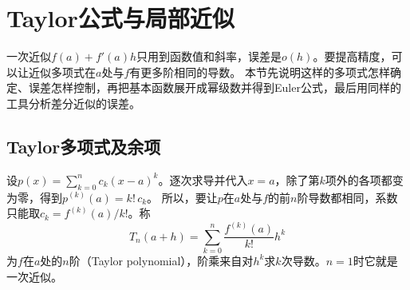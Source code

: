 \section{Taylor公式与局部近似}
\label{sec:ru-taylor}
\label{sec:analysis-taylor-approximation}

一次近似$f(a)+f'(a)h$只用到函数值和斜率，误差是$o(h)$。要提高精度，可以让近似多项式在$a$处与$f$有更多阶相同的导数。
本节先说明这样的多项式怎样确定、误差怎样控制，再把基本函数展开成幂级数并得到Euler公式，最后用同样的工具分析差分近似的误差。

\subsection{Taylor多项式及余项}
\label{sec:ru-taylor-remainders}

设$p(x)=\sum_{k=0}^nc_k(x-a)^k$。逐次求导并代入$x=a$，除了第$k$项外的各项都变为零，得到$p^{(k)}(a)=k!\,c_k$。
所以，要让$p$在$a$处与$f$的前$n$阶导数都相同，系数只能取$c_k=f^{(k)}(a)/k!$。称
\[
 T_n(a+h)=\sum_{k=0}^n\frac{f^{(k)}(a)}{k!}h^k
\]
为$f$在$a$处的$n$阶（Taylor polynomial），阶乘来自对$h^k$求$k$次导数。$n=1$时它就是一次近似。

